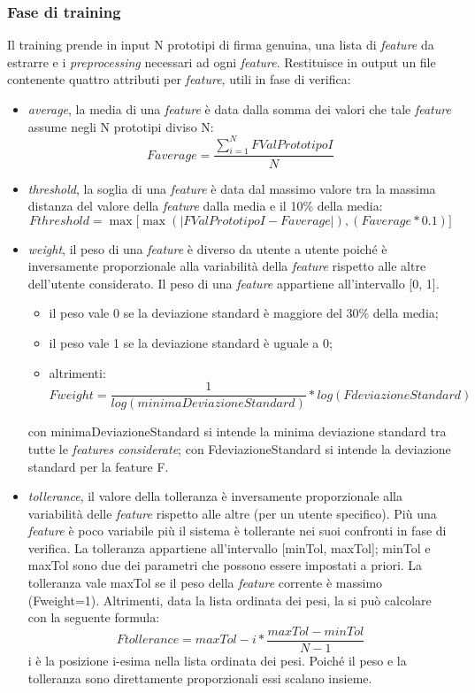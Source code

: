 \subsubsection*{Fase di training}
\label{2.1.4.1}
Il training prende in input N prototipi di firma genuina, una lista di \emph{feature} da estrarre e i \emph{preprocessing} necessari ad ogni \emph{feature}. Restituisce in output un file contenente quattro attributi per \emph{feature}, utili in fase di verifica:
\begin{itemize}
\item \emph{average}, la media di una \emph{feature} è data dalla somma dei valori che tale \emph{feature} assume negli N prototipi diviso N:
\[Faverage =
\frac{\sum\limits_{i=1}^N FValPrototipoI}{N}
\]
\item \emph{threshold}, la soglia di una \emph{feature} è data dal massimo valore tra la massima distanza del valore della \emph{feature} dalla media e il 10\% della media:
\[Fthreshold = 
\max \lbrack \max ( |FValPrototipoI - Faverage| ) , ( Faverage * 0.1 )\rbrack
\]
\item \emph{weight}, il peso di una \emph{feature} è diverso da utente a utente poiché è inversamente proporzionale alla variabilità della \emph{feature} rispetto alle altre dell'utente considerato. Il peso di una \emph{feature} appartiene all'intervallo [0, 1].
\begin{itemize}
\item il peso vale 0 se la deviazione standard è maggiore del 30\% della media;
\item il peso vale 1 se la deviazione standard è uguale a 0;
\item altrimenti:
\[Fweight = \frac{1}{log(minimaDeviazioneStandard)} * log(FdeviazioneStandard)\]
\end{itemize}
con minimaDeviazioneStandard si intende la minima deviazione standard tra tutte le \emph{features considerate}; con FdeviazioneStandard si intende la deviazione standard per la feature F.
\item \emph{tollerance}, il valore della tolleranza è inversamente proporzionale alla variabilità delle \emph{feature} rispetto alle altre (per un utente specifico). Più una \emph{feature} è poco variabile più il sistema è tollerante nei suoi confronti in fase di verifica. La tolleranza appartiene all'intervallo [minTol, maxTol]; minTol e maxTol sono due dei parametri che possono essere impostati a priori. La tolleranza vale maxTol se il peso della \emph{feature} corrente è massimo (Fweight=1). Altrimenti, data la lista ordinata dei pesi, la si può calcolare con la seguente formula:
\[Ftollerance=maxTol - i * \frac{maxTol - minTol}{N-1}\]
i è la posizione i-esima nella lista ordinata dei pesi. Poiché il peso e la tolleranza sono direttamente proporzionali essi scalano insieme.
\end{itemize}

